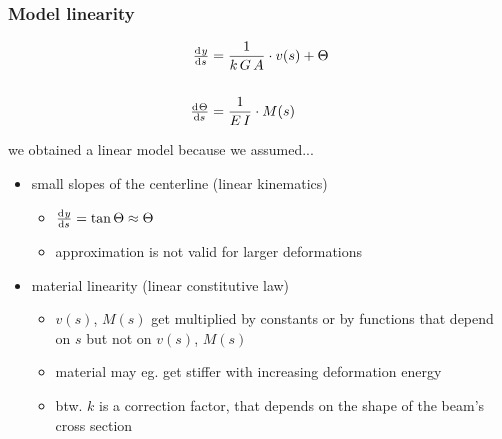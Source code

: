 \begin{frame}
  \frametitle{Model linearity}
  
  \begin{displaymath}
    \begin{alignedat}{1}
      \od{y}{s} &= \frac{1}{k \, G \, A} \cdot v(s) + \Theta  \\ \\
      \od{\Theta}{s} &= \frac{1}{E \, I} \cdot M(s)
    \end{alignedat}
  \end{displaymath}

  \vspace{1em}
  we obtained a linear model because we assumed...
  \begin{itemize}
    \item small slopes of the centerline (linear kinematics)
      \begin{itemize}
        \item $\od{y}{s} = \tan{\Theta} \approx \Theta$
        \item approximation is not valid for larger deformations
      \end{itemize} 
    \item material linearity (linear constitutive law)
      \begin{itemize}
        \item $v(s)$, $M(s)$ get multiplied by constants \newline
          or by functions that depend on $s$ but not on $v(s)$, $M(s)$
        \item material may eg. get stiffer with increasing deformation energy
        \item btw. $k$ is a correction factor, that depends on the shape of the beam's cross section
      \end{itemize}
  \end{itemize}
\end{frame}

